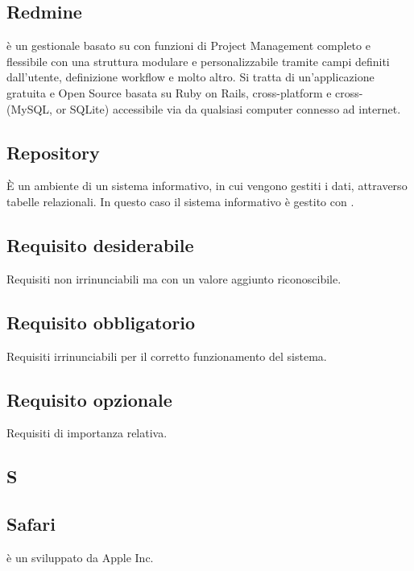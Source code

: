 \subsection*{Redmine}
 è un  gestionale basato su  con funzioni di Project Management completo e flessibile con una struttura modulare e personalizzabile tramite campi definiti dall'utente, definizione workflow e molto altro.
Si tratta di un'applicazione gratuita e Open Source basata su  Ruby on Rails, cross-platform e cross- (MySQL,  or SQLite) accessibile via  da qualsiasi computer connesso ad internet.

\subsection*{Repository}
È un ambiente di un sistema informativo, in cui vengono gestiti i dati, attraverso
tabelle relazionali. In questo caso il sistema informativo è gestito con .

\subsection*{Requisito desiderabile}
Requisiti non irrinunciabili ma con un valore aggiunto riconoscibile.

\subsection*{Requisito obbligatorio}
Requisiti irrinunciabili per il corretto funzionamento del sistema.

\subsection*{Requisito opzionale}
Requisiti di importanza relativa.

\newpage

\begin{center}
\Huge\section*{\uppercase{S}}
\end{center}

\subsection*{Safari}
 è un   sviluppato da Apple Inc. 

